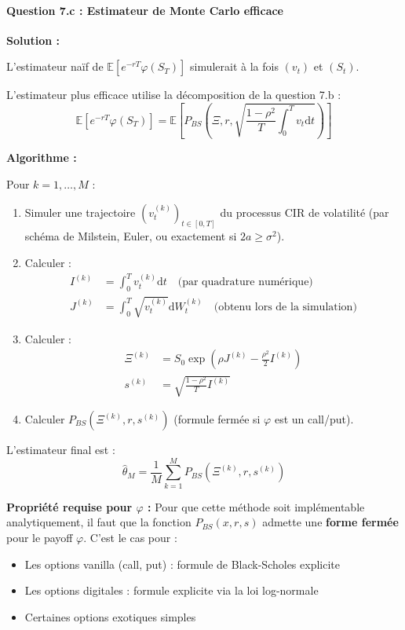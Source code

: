 \documentclass[12pt,a4paper]{article}
\theoremstyle{definition}
\theoremstyle{remark}
\newcommand{\E}{\mathbb{E}}
\newcommand{\dd}{\mathrm{d}}
\begin{document}
\paragraph{Question 7.c : Estimateur de Monte Carlo efficace}

\textbf{Solution :}

L'estimateur naïf de $\E[e^{-rT}\varphi(S_T)]$ simulerait à la fois $(v_t)$ et $(S_t)$.

L'estimateur plus efficace utilise la décomposition de la question 7.b :
\[
\E[e^{-rT}\varphi(S_T)] = \E\left[P_{BS}\left(\Xi, r, \sqrt{\frac{1-\rho^2}{T}\int_0^T v_t\dd t}\right)\right]
\]

\textbf{Algorithme :}

Pour $k = 1, \ldots, M$ :
\begin{enumerate}
\item Simuler une trajectoire $(v_t^{(k)})_{t \in [0,T]}$ du processus CIR de volatilité (par schéma de Milstein, Euler, ou exactement si $2a \geq \sigma^2$).

\item Calculer :
\begin{align*}
I^{(k)} &= \int_0^T v_t^{(k)}\dd t \quad \text{(par quadrature numérique)} \\
J^{(k)} &= \int_0^T \sqrt{v_t^{(k)}}\dd W_t^{(k)} \quad \text{(obtenu lors de la simulation)}
\end{align*}

\item Calculer :
\begin{align*}
\Xi^{(k)} &= S_0 \exp\left(\rho J^{(k)} - \frac{\rho^2}{2}I^{(k)}\right) \\
s^{(k)} &= \sqrt{\frac{1-\rho^2}{T}I^{(k)}}
\end{align*}

\item Calculer $P_{BS}(\Xi^{(k)}, r, s^{(k)})$ (formule fermée si $\varphi$ est un call/put).
\end{enumerate}

L'estimateur final est :
\[
\hat{\theta}_M = \frac{1}{M}\sum_{k=1}^M P_{BS}(\Xi^{(k)}, r, s^{(k)})
\]

\textbf{Propriété requise pour $\varphi$ :} Pour que cette méthode soit implémentable analytiquement, il faut que la fonction $P_{BS}(x,r,s)$ admette une \textbf{forme fermée} pour le payoff $\varphi$. C'est le cas pour :
\begin{itemize}
\item Les options vanilla (call, put) : formule de Black-Scholes explicite
\item Les options digitales : formule explicite via la loi log-normale
\item Certaines options exotiques simples
\end{itemize}
\end{document}
